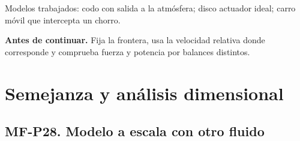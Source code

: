 \begin{tcolorbox}[studiumcheck,breakable=false,title={Síntesis y comprobación}]Modelos trabajados: codo con salida a la atmósfera; disco actuador ideal; carro móvil que intercepta un chorro.\par\textbf{Antes de continuar.} Fija la frontera, usa la velocidad relativa donde corresponde y comprueba fuerza y potencia por balances distintos.\end{tcolorbox}

\chapter{Semejanza y análisis dimensional}


\Needspace{.30\textheight}\section{MF-P28. Modelo a escala con otro fluido}

